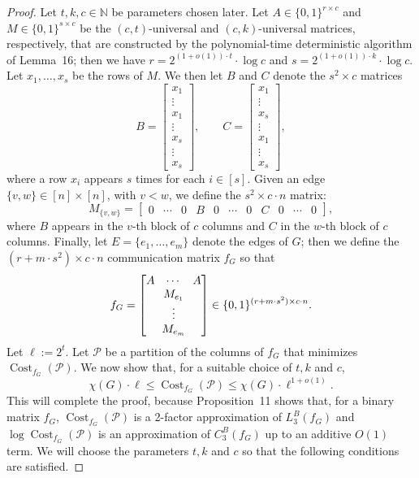 \documentclass[10pt,a4paper]{article}
\begin{document}
\begin{proof}
Let $t,k,c\in\mathbb N$ be parameters chosen later. Let $A\in\{0,1\}^{r\times c}$ and $M\in\{0,1\}^{s\times c}$ be the $(c,t)$-universal and $(c,k)$-universal matrices, respectively, that are constructed by the polynomial-time deterministic algorithm of Lemma~16; then we have $r=2^{(1+o(1))\cdot t}\cdot\log c$ and $s=2^{(1+o(1))\cdot k}\cdot\log c$.
Let $x_1,\ldots,x_s$ be the rows of $M$. We then let $B$ and $C$ denote the $s^2\times c$ matrices
\[
B=\begin{bmatrix}x_1\\\vdots\\x_1\\\vdots\\x_s\\\vdots\\x_s\end{bmatrix},\qquad
C=\begin{bmatrix}x_1\\\vdots\\x_s\\\vdots\\x_1\\\vdots\\x_s\end{bmatrix},
\]
where a row $x_i$ appears $s$ times for each $i\in[s]$. Given an edge $\{v,w\}\in[n]\times[n]$, with $v<w$, we define the $s^2\times c\cdot n$ matrix:
\[M_{\{v,w\}}=\begin{bmatrix}0&\cdots&0&B&0&\cdots&0&C&0&\cdots&0\end{bmatrix},\]
where $B$ appears in the $v$-th block of $c$ columns and $C$ in the $w$-th block of $c$ columns. Finally, let $E=\{e_1,\ldots,e_m\}$ denote the edges of $G$; then we define the $(r+m\cdot s^2)\times c\cdot n$ communication matrix $f_G$ so that
\[f_G=\begin{bmatrix}A&\cdots&A\\\multicolumn{3}{c}{M_{e_1}}\\\multicolumn{3}{c}{\vdots}\\\multicolumn{3}{c}{M_{e_m}}\end{bmatrix}\in\{0,1\}^{(r+m\cdot s^2)\times c\cdot n}.\]
Let $\ell:=2^t$. Let $\mathcal P$ be a partition of the columns of $f_G$ that minimizes $\operatorname{Cost}_{f_G}(\mathcal P)$. We now show that, for a suitable choice of $t,k$ and $c$,
\[\chi(G)\cdot\ell\le\operatorname{Cost}_{f_G}(\mathcal P)\le\chi(G)\cdot\ell^{1+o(1)}.\]
This will complete the proof, because Proposition~11 shows that, for a binary matrix $f_G$, $\operatorname{Cost}_{f_G}(\mathcal P)$ is a 2-factor approximation of $L_3^B(f_G)$ and $\log\operatorname{Cost}_{f_G}(\mathcal P)$ is an approximation of $C_3^B(f_G)$ up to an additive $O(1)$ term. We will choose the parameters $t,k$ and $c$ so that the following conditions are satisfied.

\end{proof}
\end{document}
